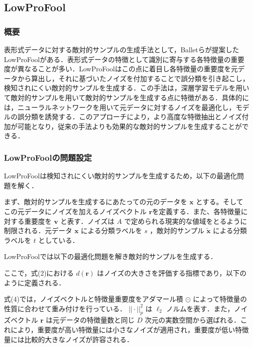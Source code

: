 \subsection{LowProFool}
\subsubsection{概要}
表形式データに対する敵対的サンプルの生成手法として，Balletらが提案したLowProFool\cite{ballet2019imperceptible}がある．表形式データの特徴として識別に寄与する各特徴量の重要度が異なることが多い．LowProFoolはこの点に着目し各特徴量の重要度を元データから算出し，それに基づいたノイズを付加することで誤分類を引き起こし，検知されにくい敵対的サンプルを生成する．この手法は，深層学習モデルを用いて敵対的サンプルを用いて敵対的サンプルを生成する点に特徴がある．具体的には，ニューラルネットワークを用いて元データに対するノイズを最適化し，モデルの誤分類を誘発する．このアプローチにより，より高度な特徴抽出とノイズ付加が可能となり，従来の手法よりも効果的な敵対的サンプルを生成することができる．

\subsubsection{LowProFoolの問題設定}
LowProFoolは検知されにくい敵対的サンプルを生成するため，以下の最適化問題を解く．

まず、敵対的サンプルを生成するにあたっての元のデータを $\bm{x}$ とする。そしてこの元データにノイズを加えるノイズベクトル $\bm{r}$を定義する．また、各特徴量に対する重要度を $\bm{v}$ と表す．ノイズは $A$ で定められる現実的な値域をとるように制限される．元データ $\bm{x}$ による分類ラベルを $s$ ，敵対的サンプル $\bm{\tilde{x}}$ による分類ラベルを $t$ としている．

LowProFoolでは以下の最適化問題を解き敵対的サンプルを生成する．

ここで，式(2)における $d(\bm{r})$ はノイズの大きさを評価する指標であり，以下のように定義される．

式(4)では，ノイズベクトルと特徴量重要度をアダマール積 $\odot$ によって特徴量の性質に合わせて重み付けを行っている． $||\cdot||^2_p$ は $\ell_2$ ノルムを表す．また，ノイズベクトル $\bm{r}$ は元データの特徴量数と同じ $D$ 次元の実数空間から選ばれる．これにより，重要度が高い特徴量には小さなノイズが適用され，重要度が低い特徴量には比較的大きなノイズが許容される．

